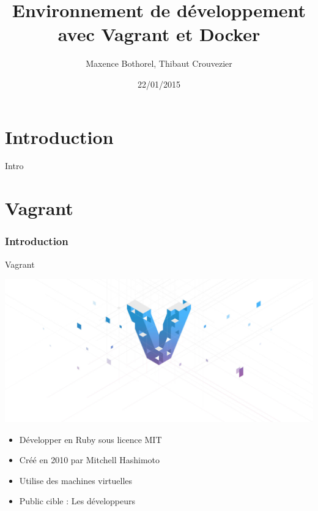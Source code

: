 \documentclass{beamer}
\title{Environnement de développement avec Vagrant et Docker}
\author{Maxence Bothorel, Thibaut Crouvezier}
\institute{Licence professionnelle ASRALL,\\
    IUT Nancy Charlemagne,\\
    Nancy}
\date{22/01/2015}
\begin{document}
    \begin{frame}
        \maketitle{}
    \end{frame}
    	
    \section{Introduction}
    	
    \begin{frame}
        Intro
    \end{frame}
    
    \section{Vagrant}
    \subsubsection{Introduction}
    
    \begin{frame}{Vagrant}
        \begin{center}
            \includegraphics[scale=0.1]{images_rapport/vagrant_logo.jpg}
        \end{center}
        \begin{itemize}
            \item{Développer en Ruby sous licence MIT}
            \item{Créé en 2010 par Mitchell Hashimoto}
            \item{Utilise des machines virtuelles}
            \item{Public cible : Les développeurs}
        \end{itemize}
    \end{frame}
\end{document}
